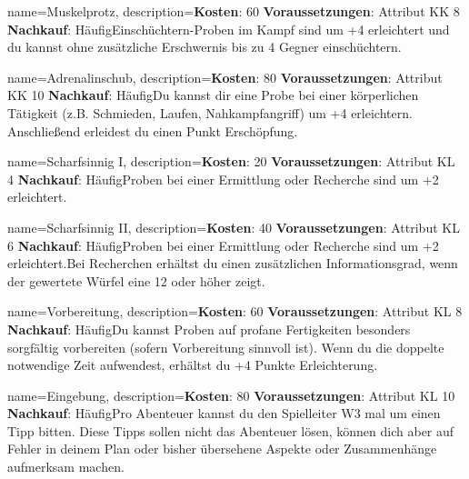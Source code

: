 {
    name={Muskelprotz},
    description={\textbf{Kosten}: 60 \textbf{Voraussetzungen}: Attribut KK 8 \textbf{Nachkauf}: Häufig\newline Einschüchtern-Proben im Kampf sind um +4 erleichtert und du kannst ohne zusätzliche Erschwernis bis zu 4 Gegner einschüchtern.}
}


{
    name={Adrenalinschub},
    description={\textbf{Kosten}: 80 \textbf{Voraussetzungen}: Attribut KK 10 \textbf{Nachkauf}: Häufig\newline Du kannst dir eine Probe bei einer körperlichen Tätigkeit (z.B. Schmieden, Laufen, Nahkampfangriff) um +4 erleichtern. Anschließend erleidest du einen Punkt Erschöpfung.}
}


{
    name={Scharfsinnig I},
    description={\textbf{Kosten}: 20 \textbf{Voraussetzungen}: Attribut KL 4 \textbf{Nachkauf}: Häufig\newline Proben bei einer Ermittlung oder Recherche sind um +2 erleichtert.}
}


{
    name={Scharfsinnig II},
    description={\textbf{Kosten}: 40 \textbf{Voraussetzungen}: Attribut KL 6 \textbf{Nachkauf}: Häufig\newline Proben bei einer Ermittlung oder Recherche sind um +2 erleichtert.\newline Bei Recherchen erhältst du einen zusätzlichen Informationsgrad, wenn der gewertete Würfel eine 12 oder höher zeigt.}
}


{
    name={Vorbereitung},
    description={\textbf{Kosten}: 60 \textbf{Voraussetzungen}: Attribut KL 8 \textbf{Nachkauf}: Häufig\newline Du kannst Proben auf profane Fertigkeiten besonders sorgfältig vorbereiten (sofern Vorbereitung sinnvoll ist). Wenn du die doppelte notwendige Zeit aufwendest, erhältst du +4 Punkte Erleichterung.}
}


{
    name={Eingebung},
    description={\textbf{Kosten}: 80 \textbf{Voraussetzungen}: Attribut KL 10 \textbf{Nachkauf}: Häufig\newline Pro Abenteuer kannst du den Spielleiter W3 mal um einen Tipp bitten. Diese Tipps sollen nicht das Abenteuer lösen, können dich aber auf Fehler in deinem Plan oder bisher übersehene Aspekte oder Zusammenhänge aufmerksam machen. }
}


